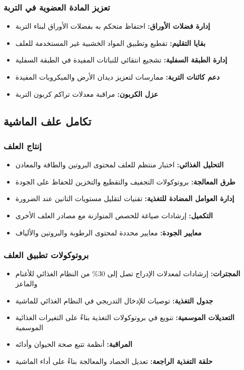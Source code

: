 \subsubsection{تعزيز المادة العضوية في التربة}
\begin{itemize}
    \item \textbf{إدارة فضلات الأوراق:} احتفاظ متحكم به بفضلات الأوراق لبناء التربة
    \item \textbf{بقايا التقليم:} تقطيع وتطبيق المواد الخشبية غير المستخدمة للعلف
    \item \textbf{إدارة الطبقة السفلية:} تشجيع انتقائي للنباتات المفيدة في الطبقة السفلية
    \item \textbf{دعم كائنات التربة:} ممارسات لتعزيز ديدان الأرض والميكروبات المفيدة
    \item \textbf{عزل الكربون:} مراقبة معدلات تراكم كربون التربة
\end{itemize}

\subsection{تكامل علف الماشية}

\subsubsection{إنتاج العلف}
\begin{itemize}
    \item \textbf{التحليل الغذائي:} اختبار منتظم للعلف لمحتوى البروتين والطاقة والمعادن
    \item \textbf{طرق المعالجة:} بروتوكولات التجفيف والتقطيع والتخزين للحفاظ على الجودة
    \item \textbf{إدارة العوامل المضادة للتغذية:} تقنيات لتقليل مستويات التانين عند الضرورة
    \item \textbf{التكميل:} إرشادات صياغة للحصص المتوازنة مع مصادر العلف الأخرى
    \item \textbf{معايير الجودة:} معايير محددة لمحتوى الرطوبة والبروتين والألياف
\end{itemize}

\subsubsection{بروتوكولات تطبيق العلف}
\begin{itemize}
    \item \textbf{المجترات:} إرشادات لمعدلات الإدراج تصل إلى 30\% من النظام الغذائي للأغنام والماعز
    \item \textbf{جدول التغذية:} توصيات للإدخال التدريجي في النظام الغذائي للماشية
    \item \textbf{التعديلات الموسمية:} تنويع في بروتوكولات التغذية بناءً على التغيرات الغذائية الموسمية
    \item \textbf{المراقبة:} أنظمة تتبع صحة الحيوان وأدائه
    \item \textbf{حلقة التغذية الراجعة:} تعديل الحصاد والمعالجة بناءً على أداء الماشية
\end{itemize}

